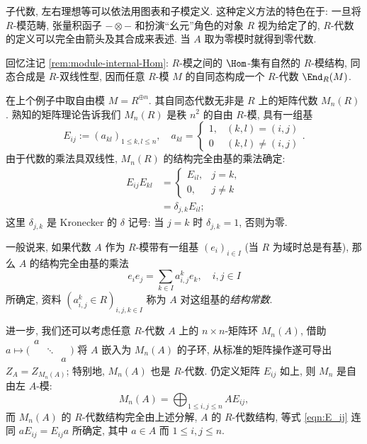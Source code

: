 子代数, 左右理想等可以依法用图表和子模定义. 这种定义方法的特色在于: 一旦将 $R$-模范畴, 张量积函子 $- \otimes -$ 和扮演``幺元''角色的对象 $R$ 视为给定了的, $R$-代数的定义可以完全由箭头及其合成来表述. 当 $A$ 取为零模时就得到零代数.

\begin{example}
	回忆注记 \ref{rem:module-internal-Hom}: $R$-模之间的 $\Hom$-集有自然的 $R$-模结构, 同态合成是 $R$-双线性型, 因而任意 $R$-模 $M$ 的自同态构成一个 $R$-代数 $\End_R(M)$.
\end{example}

\begin{example}\label{eg:matrix-algebra-1}
	在上个例子中取自由模 $M = R^{\oplus n}$. 其自同态代数无非是 $R$ 上的矩阵代数 $M_n(R)$. 熟知的矩阵理论告诉我们 $M_n(R)$ 是秩 $n^2$ 的自由 $R$-模, 具有一组基
	\[ E_{ij} := (a_{kl})_{1 \leq k,l \leq n}, \quad a_{kl} = \begin{cases} 1, & (k,l)=(i,j) \\ 0 & (k,l) \neq (i,j) \end{cases}. \]
	由于代数的乘法具双线性, $M_n(R)$ 的结构完全由基的乘法确定:
	\begin{equation}\label{eqn:E_ij}\begin{aligned}
		E_{ij} E_{kl} & = \begin{cases} E_{il}, & j=k, \\ 0, & j \neq k \end{cases} \\
		& = \delta_{j,k} E_{il};
	\end{aligned}\end{equation}
	这里 $\delta_{j,k}$ 是 Kronecker 的 $\delta$ 记号: 当 $j=k$ 时 $\delta_{j,k}=1$, 否则为零.
\end{example}

一般说来, 如果代数 $A$ 作为 $R$-模带有一组基 $(e_i)_{i \in I}$ (当 $R$ 为域时总是有基), 那么 $A$ 的结构完全由基的乘法
\[ e_i e_j = \sum_{k \in I} a^k_{i,j} e_k, \quad i,j \in I  \]
所确定, 资料 $(a^k_{i,j} \in R)_{i,j,k \in I}$ 称为 $A$ 对这组基的\emph{结构常数}.

进一步, 我们还可以考虑任意 $R$-代数 $A$ 上的 $n \times n$-矩阵环 $M_n(A)$, 借助 $a \mapsto \biggl( \begin{smallmatrix} a & & \\ & \ddots & \\ & & a \end{smallmatrix} \biggr)$ 将 $A$ 嵌入为 $M_n(A)$ 的子环, 从标准的矩阵操作遂可导出 $Z_A = Z_{M_n(A)}$; 特别地, $M_n(A)$ 也是 $R$-代数. 仍定义矩阵 $E_{ij}$ 如上, 则 $M_n$ 是自由左 $A$-模:
\[ M_n(A) = \bigoplus_{1 \leq i,j \leq n} A E_{ij}, \]
而 $M_n(A)$ 的 $R$-代数结构完全由上述分解, $A$ 的 $R$-代数结构, 等式 \eqref{eqn:E_ij} 连同 $a E_{ij} = E_{ij} a$ 所确定, 其中 $a \in A$ 而 $1 \leq i,j \leq n$.

